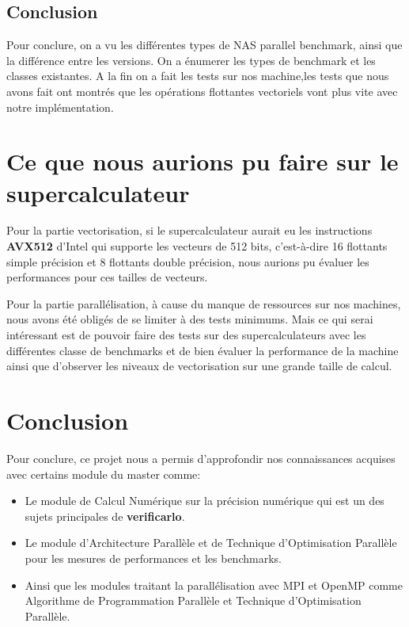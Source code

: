 \documentclass[11pt, letterpaper]{article}
\begin{document}
\subsection{Conclusion}
\label{sec:orgb2c860e}

Pour conclure, on a vu les différentes types de NAS parallel benchmark, ainsi que 
la différence entre les versions. On a énumerer les types de benchmark et les classes
existantes. A la fin on a fait les tests sur nos machine,les tests que nous avons fait 
ont montrés que les opérations flottantes vectoriels vont plus vite avec notre implémentation. 

\section{Ce que nous aurions pu faire sur le supercalculateur}
\label{sec:orgc293ce8}

Pour la partie vectorisation, si le supercalculateur aurait eu les
instructions \textbf{AVX512} d'Intel qui supporte les vecteurs de 512 bits,
c'est-à-dire 16 flottants simple précision et 8 flottants double précision,
nous aurions pu évaluer les performances pour ces tailles de vecteurs.

Pour la partie parallélisation, à cause du manque de ressources sur nos
machines, nous avons été obligés de se limiter à des tests minimums. Mais ce
qui serai intéressant est de pouvoir faire des tests sur des supercalculateurs
avec les différentes classe de benchmarks et de bien évaluer la performance de
la machine ainsi que d'observer les niveaux de vectorisation sur une grande
taille de calcul.

\section{Conclusion}
\label{sec:orge531294}

Pour conclure, ce projet nous a permis d'approfondir nos connaissances acquises
avec certains module du master comme:
\begin{itemize}
\item Le module de Calcul Numérique sur la précision numérique qui est un des sujets
principales de \textbf{verificarlo}.
\item Le module d'Architecture Parallèle et de Technique d'Optimisation Parallèle
pour les mesures de performances et les benchmarks.
\item Ainsi que les modules traitant la parallélisation avec MPI et OpenMP comme
Algorithme de Programmation Parallèle et Technique d'Optimisation Parallèle.
\end{itemize}
\end{document}
